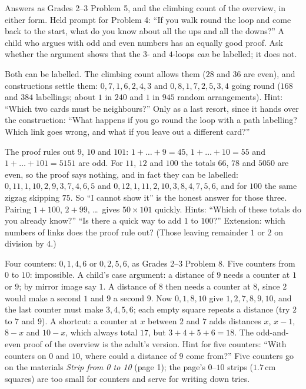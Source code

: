 Answers as Grades 2--3 Problem 5, and the climbing count of the overview, in either form. Held prompt for Problem 4: ``If you walk round the loop and come back to the start, what do you know about all the ups and all the downs?'' A child who argues with odd and even numbers has an equally good proof. Ask whether the argument shows that the $3$- and $4$-loops \emph{can} be labelled; it does not.

Both can be labelled. The climbing count allows them ($28$ and $36$ are even), and constructions settle them: $0,7,1,6,2,4,3$ and $0,8,1,7,2,5,3,4$ going round ($168$ and $384$ labellings; about $1$ in $240$ and $1$ in $945$ random arrangements). Hint: ``Which two cards must be neighbours?'' Only as a last resort, since it hands over the construction: ``What happens if you go round the loop with a path labelling? Which link goes wrong, and what if you leave out a different card?''

The proof rules out $9$, $10$ and $101$: $1+\dots+9=45$, $1+\dots+10=55$ and $1+\dots+101=5151$ are odd. For $11$, $12$ and $100$ the totals $66$, $78$ and $5050$ are even, so the proof says nothing, and in fact they can be labelled: $0,11,1,10,2,9,3,7,4,6,5$ and $0,12,1,11,2,10,3,8,4,7,5,6$, and for $100$ the same zigzag skipping $75$. So ``I cannot show it'' is the honest answer for those three. Pairing $1+100$, $2+99$, \dots\ gives $50\times101$ quickly. Hints: ``Which of these totals do you already know?'' ``Is there a quick way to add $1$ to $100$?'' Extension: which numbers of links does the proof rule out? (Those leaving remainder $1$ or $2$ on division by $4$.)

Four counters: $0,1,4,6$ or $0,2,5,6$, as Grades 2--3 Problem 8. Five counters from $0$ to $10$: impossible. A child's case argument: a distance of $9$ needs a counter at $1$ or $9$; by mirror image say $1$. A distance of $8$ then needs a counter at $8$, since $2$ would make a second $1$ and $9$ a second $9$. Now $0,1,8,10$ give $1,2,7,8,9,10$, and the last counter must make $3,4,5,6$; each empty square repeats a distance (try $2$ to $7$ and $9$). A shortcut: a counter at $x$ between $2$ and $7$ adds distances $x$, $x-1$, $8-x$ and $10-x$, which always total $17$, but $3+4+5+6=18$. The odd-and-even proof of the overview is the adult's version. Hint for five counters: ``With counters on $0$ and $10$, where could a distance of $9$ come from?'' Five counters go on the materials \emph{Strip from 0 to 10} (page 1); the page's $0$--$10$ strips ($1.7$\,cm squares) are too small for counters and serve for writing down tries.

